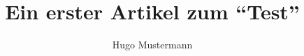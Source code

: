 \documentclass{dtk2}
\author{Hugo Mustermann}
\begin{document}
\title{Ein erster Artikel zum "`Test"'}

\maketitle

\blinddocument

%
\end{document}
